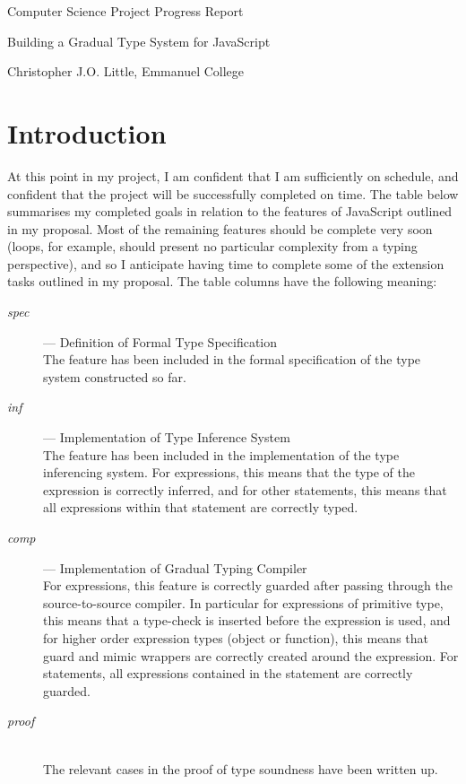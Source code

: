 \documentclass{article}
\begin{document}
	\vfil 
	\centerline{\large Computer Science Project Progress Report}
	\vspace{0.4in}
	\centerline{\Large Building a Gradual Type System for JavaScript }
	\vspace{0.4in}
	\centerline{\large Christopher J.O. Little, Emmanuel College}

	\section*{Introduction}

	At this point in my project, I am confident that I am sufficiently on
	schedule, and confident that the project will be successfully completed on
	time. The table below summarises my completed goals in relation to the
	features of JavaScript outlined in my proposal. Most of the remaining
	features should be complete very soon (loops, for example, should present
	no particular complexity from a typing perspective), and so I anticipate
	having time to complete some of the extension tasks outlined in my
	proposal. The table columns have the following meaning:

	\begin{description}
		\item[\textit{spec}] --- Definition of Formal Type Specification \hfill \\

			The feature has been included in the formal specification of the
			type system constructed so far.
		
		\item[\textit{inf}] --- Implementation of Type Inference System \hfill \\

			The feature has been included in the implementation of the type
			inferencing system. For expressions, this means that the type of
			the expression is correctly inferred, and for other statements,
			this means that all expressions within that statement are
			correctly typed.
		
		\item[\textit{comp}] --- Implementation of Gradual Typing Compiler \hfill \\
			
			For expressions, this feature is correctly guarded after passing
			through the source-to-source compiler. In particular for
			expressions of primitive type, this means that a type-check is
			inserted before the expression is used, and for higher order
			expression types (object or function), this means that guard and
			mimic wrappers are correctly created around the expression. For
			statements, all expressions contained in the statement are
			correctly guarded.
		
		\item[\textit{proof}] \hfill \\
		
			The relevant cases in the proof of type soundness have been written
			up.

	\end{description}
\end{document}
